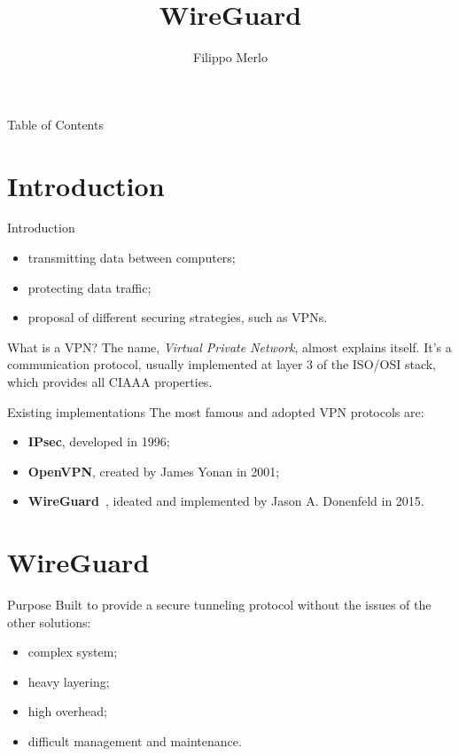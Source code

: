\documentclass[light]{presenta}
\title{WireGuard}
\author{Filippo Merlo}
\begin{document}
\begin{frame}
  \titlepage
\end{frame}

\begin{frame}{Table of Contents}
  \tableofcontents
\end{frame}

\section{Introduction}

\begin{frame}{Introduction}
  \begin{itemize}
    \item transmitting data between computers;
    \item protecting data traffic;
    \item proposal of different securing strategies, such as VPNs.
  \end{itemize}
\end{frame}

\begin{frame}{What is a VPN?}
  The name, \textit{Virtual Private Network}, almost explains itself.
  It's a communication protocol, usually implemented at layer 3 of the ISO/OSI stack, which provides all CIAAA properties.
  \begin{figure}[H]
    
  \end{figure}
\end{frame}

\begin{frame}{Existing implementations}
  The most famous and adopted VPN protocols are:
  \begin{itemize}
    \item \textbf{IPsec}, developed in 1996;
    \item \textbf{OpenVPN}, created by James Yonan in 2001;
    \item \textbf{WireGuard}~\cite{whitepaper}, ideated and implemented by Jason A. Donenfeld in 2015.
  \end{itemize}
\end{frame}

\section{WireGuard}

\begin{frame}{Purpose}
  Built to provide a secure tunneling protocol without the issues of the other solutions:
  \begin{itemize}
    \item complex system;
    \pause
    \item heavy layering;
    \pause
    \item high overhead;
    \pause
    \item difficult management and maintenance.
  \end{itemize}
\end{frame}
\end{document}

